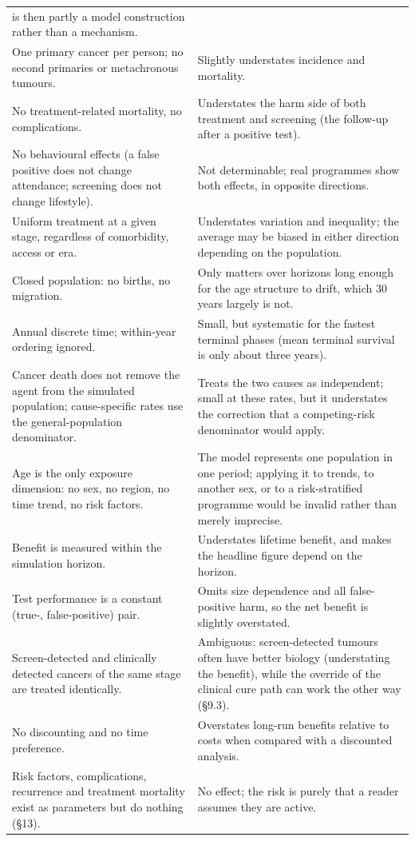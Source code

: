\documentclass[12pt,a4paper]{article}
\begin{document}
{\begin{center}
\begin{tabular}{@{}p{8.0cm}p{7.6cm}@{}}
is then partly a model construction rather than a mechanism. \\
One primary cancer per person; no second primaries or metachronous tumours. & Slightly understates incidence
and mortality. \\
No treatment-related mortality, no complications. & Understates the harm side of both treatment and
screening (the follow-up after a positive test). \\
No behavioural effects (a false positive does not change attendance; screening does not change lifestyle).
& Not determinable; real programmes show both effects, in opposite directions. \\
Uniform treatment at a given stage, regardless of comorbidity, access or era. & Understates variation and
inequality; the average may be biased in either direction depending on the population. \\
Closed population: no births, no migration. & Only matters over horizons long enough for the age structure
to drift, which 30 years largely is not. \\
Annual discrete time; within-year ordering ignored. & Small, but systematic for the fastest terminal
phases (mean terminal survival is only about three years). \\
Cancer death does not remove the agent from the simulated population; cause-specific rates use the
general-population denominator. & Treats the two causes as independent; small at these rates, but it
understates the correction that a competing-risk denominator would apply. \\
Age is the only exposure dimension: no sex, no region, no time trend, no risk factors. & The model
represents one population in one period; applying it to trends, to another sex, or to a risk-stratified
programme would be invalid rather than merely imprecise. \\
Benefit is measured within the simulation horizon. & Understates lifetime benefit, and makes the headline
figure depend on the horizon. \\
Test performance is a constant (true-, false-positive) pair. & Omits size dependence and all false-positive
harm, so the net benefit is slightly overstated. \\
Screen-detected and clinically detected cancers of the same stage are treated identically. & Ambiguous:
screen-detected tumours often have better biology (understating the benefit), while the override of the
clinical cure path can work the other way (\S9.3). \\
No discounting and no time preference. & Overstates long-run benefits relative to costs when compared with
a discounted analysis. \\
Risk factors, complications, recurrence and treatment mortality exist as parameters but do nothing
(\S13). & No effect; the risk is purely that a reader assumes they are active. \\
\bottomrule
\end{tabular}
\end{center}}
\end{document}
